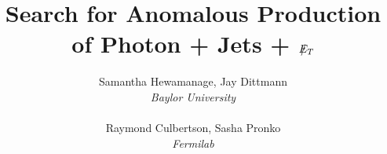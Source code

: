 \documentclass[11pt]{article}
\begin{document}
\newcommand{\zgee}{\mbox{$Z/\gamma^*\rightarrow e^+e^-$}\xspace}
\newcommand{\W}{\mbox{$W^\pm$}\xspace}
\newcommand{\Wenu}{\mbox{$W^\pm\rightarrow e^\pm\nu$}\xspace}
\newcommand{\wenu}{\mbox{$W\rightarrow e\nu$}\xspace}
\newcommand{\wmnu}{\mbox{$W\rightarrow \mu\nu$}\xspace}
\newcommand{\wtnu}{\mbox{$W\rightarrow \tau\nu$}\xspace}

\newcommand{\pt}{\mbox{$p_T$}\xspace}
\newcommand{\Ht}{\mbox{$H_T$}\xspace}
\newcommand{\et}{\mbox{$E_T$}\xspace}
\newcommand{\etcorr}{\mbox{$E_T^{corr}$}\xspace}
\newcommand{\ecorr}{\mbox{$E^{corr}$}\xspace}
\newcommand{\met}{\mbox{$\sla{E}_T$}\xspace}
\newcommand{\eoverp}{\mbox{$E/p$}\xspace}
\newcommand{\isoetcorr}{\mbox {$E_ {T}^{Iso(corr)}$\xspace }}
\newcommand{\superscript}[1]{\ensuremath{^\textrm{#1}}}
\newcommand{\subscript}[1]{\ensuremath{_\textrm{#1}}}
\newcommand{\phojets}{\mbox{$\gamma$ + jets}\xspace}
\newcommand{\phoonejet}{\mbox{$\gamma$ + $\geq$1 jet}\xspace}
\newcommand{\photwojet}{\mbox{$\gamma$ + $\geq$2 jets}\xspace}
\newcommand{\phojetsmet}{\mbox{\phojets + \met}\xspace}
\newcommand{\phoonejetmettwenty}{\mbox{\phoonejet + \metCorr$>20$~GeV}\xspace}
\newcommand{\photwojetmettwenty}{\mbox{\photwojet + \metCorr$>20$~GeV}\xspace}

\newcommand{\elejets}{\mbox{$\gamma^{e\rightarrow\gamma}$ + jets}\xspace}
\newcommand{\cosmicjets}{\mbox{$\gamma^{cosmic}$ + jets}\xspace}
\newcommand{\halojets}{\mbox{$\gamma^{halo}$ + jets}\xspace}
\newcommand{\pho}{\mbox{$\gamma$}\xspace}
\newcommand{\intimewindow}{\mbox{$-4.8$~ns $< t <$ +4.8~ns}\xspace}
\newcommand{\cosmictimewindow}{\mbox{+30~ns $< t <$ +90~ns}\xspace}

\newcommand{\particle}[1]{$#1$\xspace}
\newcommand{\pizero}{{$\pi^{0}$}\xspace}

\newcommand{\wjets}{\mbox{$W$ + jets}\xspace}
\newcommand{\zjets}{\mbox{$Z$ + jets}\xspace}
\newcommand{\MC}{Monte Carlo\xspace}



\title{Search for Anomalous Production of Photon + Jets + \met}
\author{Samantha Hewamanage, Jay Dittmann\\
    {\it Baylor University} \\
    \\
Raymond Culbertson, Sasha Pronko \\
    {\it Fermilab} \\
}
\end{document}
